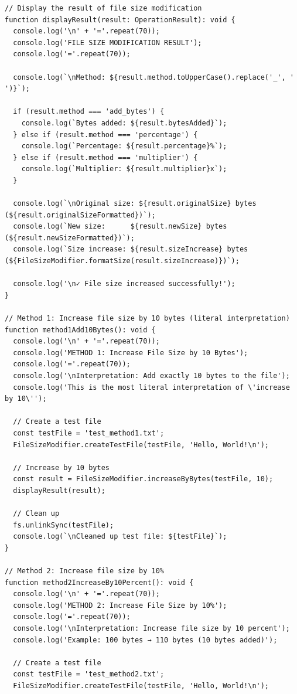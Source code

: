 \documentclass[a4paper,12pt]{article}
\begin{document}
\begin{verbatim}
// Display the result of file size modification
function displayResult(result: OperationResult): void {
  console.log('\n' + '='.repeat(70));
  console.log('FILE SIZE MODIFICATION RESULT');
  console.log('='.repeat(70));
  
  console.log(`\nMethod: ${result.method.toUpperCase().replace('_', ' ')}`);
  
  if (result.method === 'add_bytes') {
    console.log(`Bytes added: ${result.bytesAdded}`);
  } else if (result.method === 'percentage') {
    console.log(`Percentage: ${result.percentage}%`);
  } else if (result.method === 'multiplier') {
    console.log(`Multiplier: ${result.multiplier}x`);
  }
  
  console.log(`\nOriginal size: ${result.originalSize} bytes (${result.originalSizeFormatted})`);
  console.log(`New size:      ${result.newSize} bytes (${result.newSizeFormatted})`);
  console.log(`Size increase: ${result.sizeIncrease} bytes (${FileSizeModifier.formatSize(result.sizeIncrease)})`);
  
  console.log('\n✓ File size increased successfully!');
}

// Method 1: Increase file size by 10 bytes (literal interpretation)
function method1Add10Bytes(): void {
  console.log('\n' + '='.repeat(70));
  console.log('METHOD 1: Increase File Size by 10 Bytes');
  console.log('='.repeat(70));
  console.log('\nInterpretation: Add exactly 10 bytes to the file');
  console.log('This is the most literal interpretation of \'increase by 10\'');
  
  // Create a test file
  const testFile = 'test_method1.txt';
  FileSizeModifier.createTestFile(testFile, 'Hello, World!\n');
  
  // Increase by 10 bytes
  const result = FileSizeModifier.increaseByBytes(testFile, 10);
  displayResult(result);
  
  // Clean up
  fs.unlinkSync(testFile);
  console.log(`\nCleaned up test file: ${testFile}`);
}

// Method 2: Increase file size by 10%
function method2IncreaseBy10Percent(): void {
  console.log('\n' + '='.repeat(70));
  console.log('METHOD 2: Increase File Size by 10%');
  console.log('='.repeat(70));
  console.log('\nInterpretation: Increase file size by 10 percent');
  console.log('Example: 100 bytes → 110 bytes (10 bytes added)');
  
  // Create a test file
  const testFile = 'test_method2.txt';
  FileSizeModifier.createTestFile(testFile, 'Hello, World!\n');
  

\end{verbatim}
\end{document}
